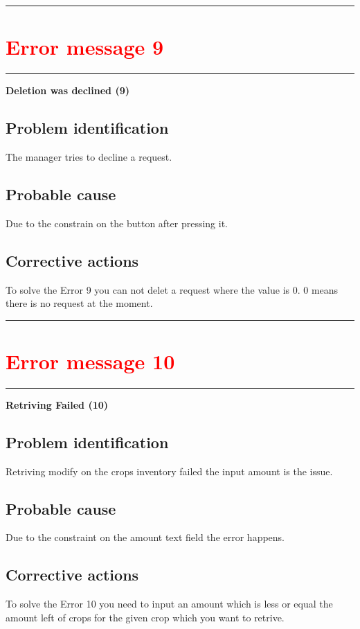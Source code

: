 \vspace{0.5cm}
\hrule


\section{{\textbf{\textcolor{red}{Error message 9}}}} 
\hrule
\vspace{0.5cm}
\textbf{Deletion was declined (9)}

\subsection{Problem identification}
The manager tries to decline a request.

\subsection{Probable cause}
Due to the constrain on the button after pressing it.

\subsection{Corrective actions}
To solve the Error 9 you can not delet a request where the value is 0. 0 means
there is no request at the moment.

\vspace{0.5cm}
\hrule
\break

\section{{\textbf{\textcolor{red}{Error message 10}}}}
\hrule
\vspace{0.5cm}
\textbf{Retriving Failed (10)}

\subsection{Problem identification}
Retriving modify on the crops inventory failed the input amount is the issue.

\subsection{Probable cause}
Due to the constraint on the amount text field the error happens.

\subsection{Corrective actions}
To solve the Error 10 you need to input an amount which is less or equal the
amount left of crops for the given crop which you want to retrive.

